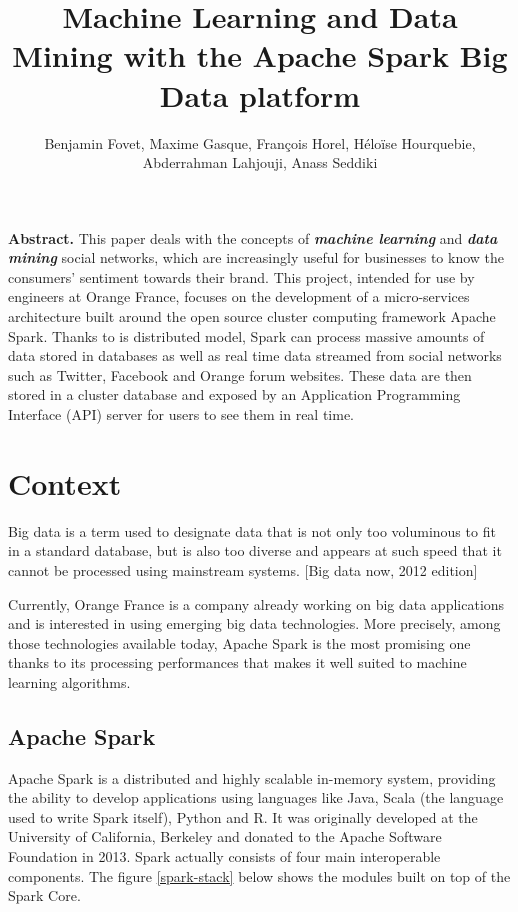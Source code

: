 \documentclass[11pt]{article}
\title{\textbf{Machine Learning and Data Mining with the Apache Spark Big Data platform}}
\author{Benjamin Fovet, Maxime Gasque, François Horel, Héloïse Hourquebie, Abderrahman Lahjouji, Anass Seddiki}
\affil{\texttt{\{bfovet, mgasque, fhorel, hhourquebie, alahjouji, aseddiki\} @enseirb-matmeca.fr}}
\date{}
\begin{document}
\maketitle

\textbf{Abstract.} This paper deals with the concepts of \textbf{\textit{machine learning}} and \textbf{\textit{data mining}} social networks, which are increasingly useful for businesses to know the consumers' sentiment towards their brand. This project, intended for use by engineers at Orange France, focuses on the development of a micro-services architecture built around the open source cluster computing framework Apache Spark. Thanks to is distributed model, Spark can process massive amounts of data stored in databases as well as real time data streamed from social networks such as Twitter, Facebook and Orange forum websites. These data are then stored in a cluster database and exposed by an Application Programming Interface (API) server for users to see them in real time.


\section{Context}
Big data is a term used to designate data that is not only too voluminous to fit in a standard database, but is also too diverse and appears at such speed that it cannot be processed using mainstream systems. [Big data now, 2012 edition]

Currently, Orange France is a company already working on big data applications and is interested in using emerging big data technologies. More precisely, among those technologies available today, Apache Spark is the most promising one thanks to its processing performances that makes it well suited to machine learning algorithms.

\subsection{Apache Spark}
Apache Spark is a distributed and highly scalable in-memory system, providing the ability to develop applications using languages like Java, Scala (the language used to write Spark itself), Python and R. It was originally developed at the University of California, Berkeley and donated to the Apache Software Foundation in 2013.
Spark actually consists of four main interoperable components. The figure \ref{spark-stack} below shows the modules built on top of the Spark Core.
\end{document}
